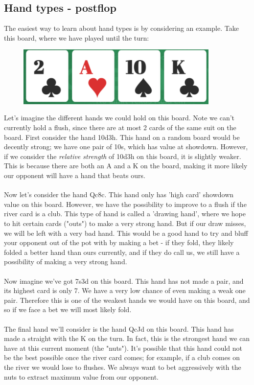 \documentclass{article}
\begin{document}
\subsection{Hand types - postflop}
The easiest way to learn about hand types is by considering an example. Take this board, where we have played until the turn:
\begin{figure}[h]
    \centering
    \includegraphics[width=100mm]{images/board_1.png}
\end{figure}\newline
Let's imagine the different hands we could hold on this board. Note we can't currently hold a flush, since there are at most 2 cards of the same suit on the board. First consider the hand 10d3h. This hand on a random board would be decently strong; we have one pair of 10s, which has value at showdown. However, if we consider the \emph{relative strength} of 10d3h on this board, it is slightly weaker. This is because there are both an A and a K on the board, making it more likely our opponent will have a hand that beats ours.\\\\ Now let's consider the hand Qc8c. This hand only has 'high card' showdown value on this board. However, we have the possibility to improve to a flush if the river card is a club. This type of hand is called a 'drawing hand', where we hope to hit certain cards ("outs") to make a very strong hand. But if our draw misses, we will be left with a very bad hand. This would be a good hand to try and bluff your opponent out of the pot with by making a bet - if they fold, they likely folded a better hand than ours currently, and if they do call us, we still have a possibility of making a very strong hand. \\\\
Now imagine we've got 7s3d on this board. This hand has not made a pair, and its highest card is only 7. We have a very low chance of even making a weak one pair. Therefore this is one of the weakest hands we would have on this board, and so if we face a bet we will most likely fold.\\\\
The final hand we'll consider is the hand QcJd on this board. This hand has made a straight with the K on the turn. In fact, this is the strongest hand we can have at this current moment (the "nuts"). It's possible that this hand could not be the best possible once the river card comes; for example, if a club comes on the river we would lose to flushes. We always want to bet aggressively with the nuts to extract maximum value from our opponent. 
\end{document}
